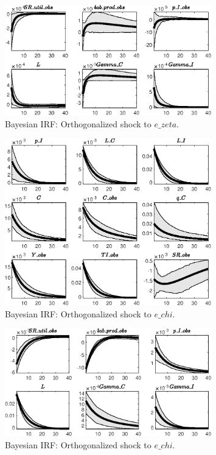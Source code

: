 \begin{figure}[H]
\centering 
\includegraphics[width=0.80\textwidth]{directed_search/Output/directed_search_Bayesian_IRF_e_zeta_2}
\caption{Bayesian IRF: Orthogonalized shock to $e\_zeta$.}
\label{Fig:BayesianIRF:e_zeta:2}
\end{figure}
 
\begin{figure}[H]
\centering 
\includegraphics[width=0.80\textwidth]{directed_search/Output/directed_search_Bayesian_IRF_e_chi_1}
\caption{Bayesian IRF: Orthogonalized shock to $e\_chi$.}
\label{Fig:BayesianIRF:e_chi:1}
\end{figure}
 
\begin{figure}[H]
\centering 
\includegraphics[width=0.80\textwidth]{directed_search/Output/directed_search_Bayesian_IRF_e_chi_2}
\caption{Bayesian IRF: Orthogonalized shock to $e\_chi$.}
\label{Fig:BayesianIRF:e_chi:2}
\end{figure}
 
